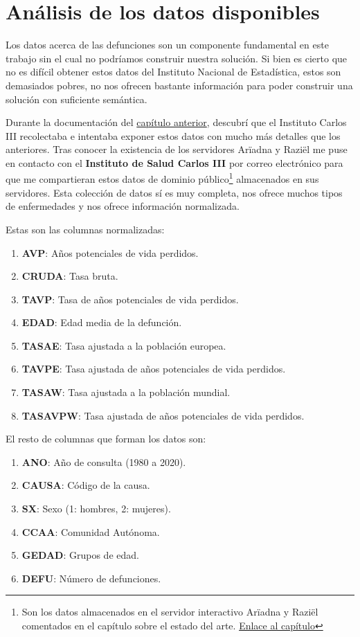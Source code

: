 \chapter{Análisis de los datos disponibles}
\label{cap:5}
Los datos acerca de las defunciones son un componente fundamental en este trabajo sin el
cual no podríamos construir nuestra solución. Si bien es cierto que no es difícil obtener
estos datos del Instituto Nacional de Estadística, estos son demasiados pobres, no nos
ofrecen bastante información para poder construir una solución con suficiente
semántica.

Durante la documentación del \hyperref[sec:estadoArte]{capítulo anterior}, descubrí que el
Instituto Carlos III recolectaba e intentaba exponer estos datos con mucho más detalles
que los anteriores. Tras conocer la existencia de los servidores Arïadna y Raziël me puse
en contacto con el \textbf{Instituto de Salud Carlos III} por correo electrónico para que
me compartieran estos datos de dominio público\footnote{Son los datos almacenados en el
servidor interactivo Arïadna y Raziël comentados en el capítulo sobre el estado del arte.
\hyperref[sec:estadoArte]{Enlace al capítulo}} almacenados en sus servidores. Esta
colección de datos sí es muy completa, nos ofrece muchos tipos de enfermedades y nos ofrece
información normalizada.

Estas son las columnas normalizadas:
\begin{enumerate}
\item \textbf{AVP}: Años potenciales de vida perdidos.
\item \textbf{CRUDA}: Tasa bruta.
\item \textbf{TAVP}: Tasa de años potenciales de vida perdidos.
\item \textbf{EDAD}: Edad media de la defunción.
\item \textbf{TASAE}: Tasa ajustada a la población europea.
\item \textbf{TAVPE}: Tasa ajustada de años potenciales de vida perdidos.
\item \textbf{TASAW}: Tasa ajustada a la población mundial.
\item \textbf{TASAVPW}: Tasa ajustada de años potenciales de vida perdidos.
\end{enumerate}

El resto de columnas que forman los datos son:
\begin{enumerate}
\item \textbf{ANO}: Año de consulta (1980 a 2020).
\item \textbf{CAUSA}: Código de la causa.
\item \textbf{SX}: Sexo (1: hombres, 2: mujeres).
\item \textbf{CCAA}: Comunidad Autónoma.
\item \textbf{GEDAD}: Grupos de edad.
\item \textbf{DEFU}: Número de defunciones.
\end{enumerate}

